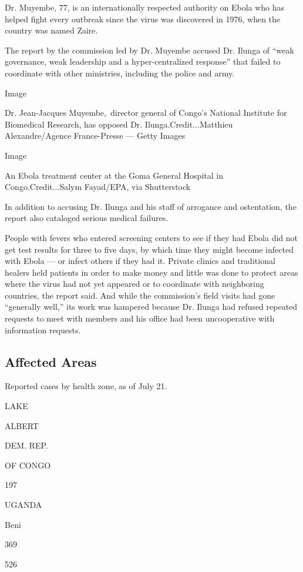 Dr. Muyembe, 77, is an internationally respected authority on Ebola who
has helped fight every outbreak since the virus was discovered in 1976,
when the country was named Zaire.

The report by the commission led by Dr. Muyembe accused Dr. Ilunga of
``weak governance, weak leadership and a hyper-centralized response''
that failed to coordinate with other ministries, including the police
and army.

Image

Dr. Jean-Jacques Muyembe,~director general of Congo's National Institute
for Biomedical Research, has opposed Dr. Ilunga.Credit...Matthieu
Alexandre/Agence France-Presse --- Getty Images

Image

An Ebola treatment center at the Goma General Hospital in
Congo.Credit...Salym Fayad/EPA, via Shutterstock

In addition to accusing Dr. Ilunga and his staff of arrogance and
ostentation, the report also cataloged serious medical failures.

People with fevers who entered screening centers to see if they had
Ebola did not get test results for three to five days, by which time
they might become infected with Ebola --- or infect others if they had
it. Private clinics and traditional healers held patients in order to
make money and little was done to protect areas where the virus had not
yet appeared or to coordinate with neighboring countries, the report
said. And while the commission's field visits had gone ``generally
well,'' its work was hampered because Dr. Ilunga had refused repeated
requests to meet with members and his office had been uncooperative with
information requests.

\hypertarget{affected-areas}{%
\subsection{Affected Areas}\label{affected-areas}}

Reported cases by health zone, as of July 21.

LAKE

ALBERT

DEM. REP.

OF CONGO

197

UGANDA

Beni

369

526

